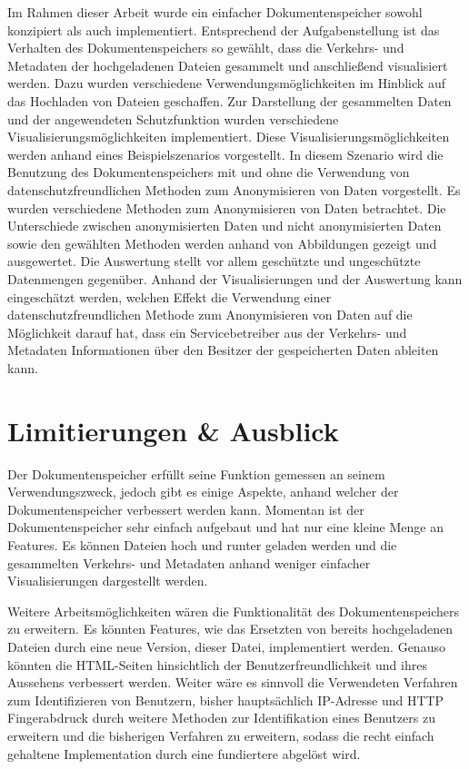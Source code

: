 \documentclass[
    fontsize=12pt,
    headings=small,
    parskip=half,           %
    bibliography=totoc,
    numbers=noenddot,       %
    open=any,               %
    ]{scrreprt}
\begin{document}
Im Rahmen dieser Arbeit wurde ein einfacher Dokumentenspeicher sowohl konzipiert als auch implementiert.
Entsprechend der Aufgabenstellung ist das Verhalten des Dokumentenspeichers so gewählt, dass die Verkehrs- und Metadaten der hochgeladenen Dateien gesammelt und anschließend visualisiert werden.
Dazu wurden verschiedene Verwendungsmöglichkeiten im Hinblick auf das Hochladen von Dateien geschaffen.
Zur Darstellung der gesammelten Daten und der angewendeten Schutzfunktion wurden verschiedene Visualisierungsmöglichkeiten implementiert.
Diese Visualisierungsmöglichkeiten werden anhand eines Beispielszenarios vorgestellt.
In diesem Szenario wird die Benutzung des Dokumentenspeichers mit und ohne die Verwendung von datenschutzfreundlichen Methoden zum Anonymisieren von Daten vorgestellt.
Es wurden verschiedene Methoden zum Anonymisieren von Daten betrachtet.
Die Unterschiede zwischen anonymisierten Daten und nicht anonymisierten Daten sowie den gewählten Methoden werden anhand von Abbildungen gezeigt und ausgewertet.
Die Auswertung stellt vor allem geschützte und ungeschützte Datenmengen gegenüber.
Anhand der Visualisierungen und der Auswertung kann eingeschätzt werden, welchen Effekt die Verwendung einer datenschutzfreundlichen Methode zum Anonymisieren von Daten auf die Möglichkeit darauf hat, dass ein Servicebetreiber aus der Verkehrs- und Metadaten Informationen über den Besitzer der gespeicherten Daten ableiten kann.

\section{Limitierungen \& Ausblick}
Der Dokumentenspeicher erfüllt seine Funktion gemessen an seinem Verwendungszweck, jedoch gibt es einige Aspekte, anhand welcher der Dokumentenspeicher verbessert werden kann.
Momentan ist der Dokumentenspeicher sehr einfach aufgebaut und hat nur eine kleine Menge an Features.
Es können Dateien hoch und runter geladen werden und die gesammelten Verkehrs- und Metadaten anhand weniger einfacher Visualisierungen dargestellt werden.

Weitere Arbeitsmöglichkeiten wären die Funktionalität des Dokumentenspeichers zu erweitern. 
Es könnten Features, wie das Ersetzten von bereits hochgeladenen Dateien durch eine neue Version, dieser Datei, implementiert werden.
Genauso könnten die HTML-Seiten hinsichtlich der Benutzerfreundlichkeit und ihres Aussehens verbessert werden. 
Weiter wäre es sinnvoll die Verwendeten Verfahren zum Identifizieren von Benutzern, bisher hauptsächlich IP-Adresse und \ac{HTTP} Fingerabdruck durch weitere Methoden zur Identifikation eines Benutzers zu erweitern und die bisherigen Verfahren zu erweitern, sodass die recht einfach gehaltene Implementation durch eine fundiertere abgelöst wird.
\end{document}
